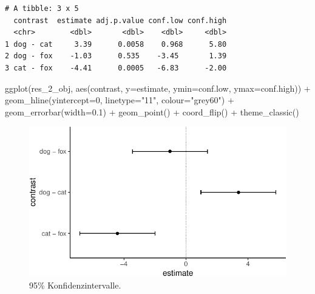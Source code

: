 \documentclass[
  letterpaper,
  DIV=11,
  oneside]{scrreport}
\newenvironment{Shaded}{\begin{snugshade}}{\end{snugshade}}
\newcommand{\AttributeTok}[1]{\textcolor[rgb]{0.40,0.45,0.13}{#1}}
\newcommand{\DecValTok}[1]{\textcolor[rgb]{0.68,0.00,0.00}{#1}}
\newcommand{\FloatTok}[1]{\textcolor[rgb]{0.68,0.00,0.00}{#1}}
\newcommand{\FunctionTok}[1]{\textcolor[rgb]{0.28,0.35,0.67}{#1}}
\newcommand{\NormalTok}[1]{\textcolor[rgb]{0.00,0.23,0.31}{#1}}
\newcommand{\SpecialCharTok}[1]{\textcolor[rgb]{0.37,0.37,0.37}{#1}}
\newcommand{\StringTok}[1]{\textcolor[rgb]{0.13,0.47,0.30}{#1}}
\begin{document}
\begin{verbatim}
# A tibble: 3 x 5
  contrast  estimate adj.p.value conf.low conf.high
  <chr>        <dbl>       <dbl>    <dbl>     <dbl>
1 dog - cat     3.39      0.0058    0.968      5.80
2 dog - fox    -1.03      0.535    -3.45       1.39
3 cat - fox    -4.41      0.0005   -6.83      -2.00
\end{verbatim}

\begin{Shaded}
\begin{Highlighting}[]
  \FunctionTok{ggplot}\NormalTok{(res\_2\_obj, }\FunctionTok{aes}\NormalTok{(contrast, }\AttributeTok{y=}\NormalTok{estimate, }\AttributeTok{ymin=}\NormalTok{conf.low, }\AttributeTok{ymax=}\NormalTok{conf.high)) }\SpecialCharTok{+}
    \FunctionTok{geom\_hline}\NormalTok{(}\AttributeTok{yintercept=}\DecValTok{0}\NormalTok{, }\AttributeTok{linetype=}\StringTok{"11"}\NormalTok{, }\AttributeTok{colour=}\StringTok{"grey60"}\NormalTok{) }\SpecialCharTok{+}
    \FunctionTok{geom\_errorbar}\NormalTok{(}\AttributeTok{width=}\FloatTok{0.1}\NormalTok{) }\SpecialCharTok{+} 
    \FunctionTok{geom\_point}\NormalTok{() }\SpecialCharTok{+}
    \FunctionTok{coord\_flip}\NormalTok{() }\SpecialCharTok{+}
    \FunctionTok{theme\_classic}\NormalTok{()}
\end{Highlighting}
\end{Shaded}

\begin{figure}[H]

{\centering \includegraphics{./stat-tests-posthoc_files/figure-pdf/fig-emmeans-1-1.pdf}

}

\caption{\label{fig-emmeans-1}95\% Konfidenzintervalle.}

\end{figure}
\end{document}
